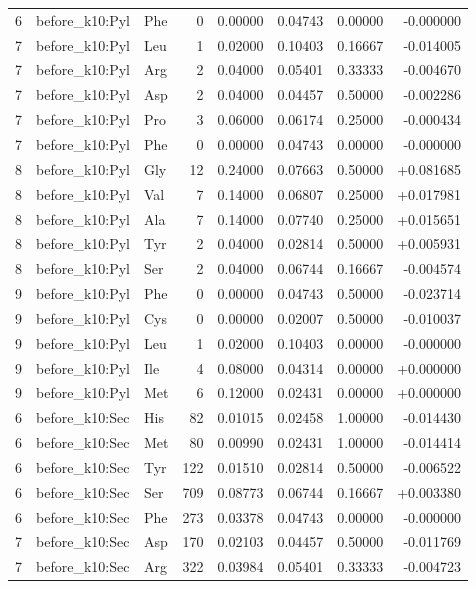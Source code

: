 \begin{longtable}{r l l r r r r r}
6 & before\_k10:Pyl & Phe & 0 & 0.00000 & 0.04743 & 0.00000 & -0.000000 \\
7 & before\_k10:Pyl & Leu & 1 & 0.02000 & 0.10403 & 0.16667 & -0.014005 \\
7 & before\_k10:Pyl & Arg & 2 & 0.04000 & 0.05401 & 0.33333 & -0.004670 \\
7 & before\_k10:Pyl & Asp & 2 & 0.04000 & 0.04457 & 0.50000 & -0.002286 \\
7 & before\_k10:Pyl & Pro & 3 & 0.06000 & 0.06174 & 0.25000 & -0.000434 \\
7 & before\_k10:Pyl & Phe & 0 & 0.00000 & 0.04743 & 0.00000 & -0.000000 \\
8 & before\_k10:Pyl & Gly & 12 & 0.24000 & 0.07663 & 0.50000 & +0.081685 \\
8 & before\_k10:Pyl & Val & 7 & 0.14000 & 0.06807 & 0.25000 & +0.017981 \\
8 & before\_k10:Pyl & Ala & 7 & 0.14000 & 0.07740 & 0.25000 & +0.015651 \\
8 & before\_k10:Pyl & Tyr & 2 & 0.04000 & 0.02814 & 0.50000 & +0.005931 \\
8 & before\_k10:Pyl & Ser & 2 & 0.04000 & 0.06744 & 0.16667 & -0.004574 \\
9 & before\_k10:Pyl & Phe & 0 & 0.00000 & 0.04743 & 0.50000 & -0.023714 \\
9 & before\_k10:Pyl & Cys & 0 & 0.00000 & 0.02007 & 0.50000 & -0.010037 \\
9 & before\_k10:Pyl & Leu & 1 & 0.02000 & 0.10403 & 0.00000 & -0.000000 \\
9 & before\_k10:Pyl & Ile & 4 & 0.08000 & 0.04314 & 0.00000 & +0.000000 \\
9 & before\_k10:Pyl & Met & 6 & 0.12000 & 0.02431 & 0.00000 & +0.000000 \\
6 & before\_k10:Sec & His & 82 & 0.01015 & 0.02458 & 1.00000 & -0.014430 \\
6 & before\_k10:Sec & Met & 80 & 0.00990 & 0.02431 & 1.00000 & -0.014414 \\
6 & before\_k10:Sec & Tyr & 122 & 0.01510 & 0.02814 & 0.50000 & -0.006522 \\
6 & before\_k10:Sec & Ser & 709 & 0.08773 & 0.06744 & 0.16667 & +0.003380 \\
6 & before\_k10:Sec & Phe & 273 & 0.03378 & 0.04743 & 0.00000 & -0.000000 \\
7 & before\_k10:Sec & Asp & 170 & 0.02103 & 0.04457 & 0.50000 & -0.011769 \\
7 & before\_k10:Sec & Arg & 322 & 0.03984 & 0.05401 & 0.33333 & -0.004723 \\

\end{longtable}
